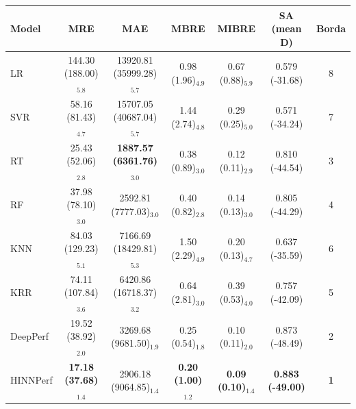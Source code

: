 \begin{tabular}{lcccccc}
\toprule
Model & MRE & MAE & MBRE & MIBRE & SA (mean D) & Borda \\
\midrule
LR & 144.30 (188.00)$_{5.8}$ & 13920.81 (35999.28)$_{5.7}$ & 0.98 (1.96)$_{4.9}$ & 0.67 (0.88)$_{5.9}$ & 0.579 (-31.68) & 8 \\
SVR & 58.16 (81.43)$_{4.7}$ & 15707.05 (40687.04)$_{5.7}$ & 1.44 (2.74)$_{4.8}$ & 0.29 (0.25)$_{5.0}$ & 0.571 (-34.24) & 7 \\
RT & 25.43 (52.06)$_{2.8}$ & \textbf{1887.57 (6361.76)$_{3.0}$} & 0.38 (0.89)$_{3.0}$ & 0.12 (0.11)$_{2.9}$ & 0.810 (-44.54) & 3 \\
RF & 37.98 (78.10)$_{3.0}$ & 2592.81 (7777.03)$_{3.0}$ & 0.40 (0.82)$_{2.8}$ & 0.14 (0.13)$_{3.0}$ & 0.805 (-44.29) & 4 \\
KNN & 84.03 (129.23)$_{5.1}$ & 7166.69 (18429.81)$_{5.3}$ & 1.50 (2.29)$_{4.9}$ & 0.20 (0.13)$_{4.7}$ & 0.637 (-35.59) & 6 \\
KRR & 74.11 (107.84)$_{3.6}$ & 6420.86 (16718.37)$_{3.2}$ & 0.64 (2.81)$_{3.0}$ & 0.39 (0.53)$_{4.0}$ & 0.757 (-42.09) & 5 \\
DeepPerf & 19.52 (38.92)$_{2.0}$ & 3269.68 (9681.50)$_{1.9}$ & 0.25 (0.54)$_{1.8}$ & 0.10 (0.11)$_{2.0}$ & 0.873 (-48.49) & 2 \\
HINNPerf & \textbf{17.18 (37.68)$_{1.4}$} & 2906.18 (9064.85)$_{1.4}$ & \textbf{0.20 (1.00)$_{1.2}$} & \textbf{0.09 (0.10)$_{1.4}$} & \textbf{0.883 (-49.00)} & \textbf{1} \\
\bottomrule
\end{tabular}
